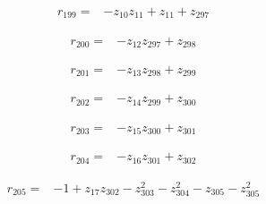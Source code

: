 \par\noindent\begin{minipage}{\linewidth}
\begin{align*}
r_{199}={}&-z_{10}z_{11}+z_{11}+z_{297}
\end{align*}
\end{minipage}\par
\par\noindent\begin{minipage}{\linewidth}
\begin{align*}
r_{200}={}&-z_{12}z_{297}+z_{298}
\end{align*}
\end{minipage}\par
\par\noindent\begin{minipage}{\linewidth}
\begin{align*}
r_{201}={}&-z_{13}z_{298}+z_{299}
\end{align*}
\end{minipage}\par
\par\noindent\begin{minipage}{\linewidth}
\begin{align*}
r_{202}={}&-z_{14}z_{299}+z_{300}
\end{align*}
\end{minipage}\par
\par\noindent\begin{minipage}{\linewidth}
\begin{align*}
r_{203}={}&-z_{15}z_{300}+z_{301}
\end{align*}
\end{minipage}\par
\par\noindent\begin{minipage}{\linewidth}
\begin{align*}
r_{204}={}&-z_{16}z_{301}+z_{302}
\end{align*}
\end{minipage}\par
\par\noindent\begin{minipage}{\linewidth}
\begin{align*}
r_{205}={}&-1+z_{17}z_{302}-z_{303}^{2}-z_{304}^{2}-z_{305}-z_{305}^{2}
\end{align*}
\end{minipage}\par
\endgroup
